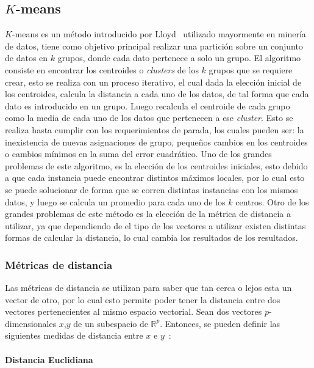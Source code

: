 	\subsection{$K$-means}
	\label{sec:k-means}
	$K$-means es un método introducido por Lloyd~\cite{Lloyd1982} utilizado mayormente en minería de datos, tiene como objetivo principal realizar una partición sobre un conjunto de datos en $k$ grupos, donde cada dato pertenece a solo un grupo.
	El algoritmo consiste en encontrar los centroides o \textit{clusters} de los $k$ grupos que se requiere crear, esto se realiza con un proceso iterativo, el cual dada la elección inicial de los centroides, calcula la distancia a cada uno de los datos, de tal forma que cada dato es introducido en un grupo. Luego recalcula el centroide de cada grupo como la media de cada uno de los datos que pertenecen a ese \textit{cluster}. Esto se realiza hasta cumplir con los requerimientos de parada, los cuales pueden ser: la inexistencia de nuevas asignaciones de grupo, pequeños cambios en los centroides o cambios mínimos en la suma del error cuadrático.
	Uno de los grandes problemas de este algoritmo, es la elección de los centroides iniciales, esto debido a que cada instancia puede encontrar distintos máximos locales, por lo cual esto se puede solucionar de forma que se corren distintas instancias con los mismos datos, y luego se calcula un promedio para cada uno de los $k$ centros.
	Otro de los grandes problemas de este método es la elección de la métrica de distancia a utilizar, ya que dependiendo de el tipo de los vectores a utilizar existen distintas formas de calcular la distancia, lo cual cambia los resultados de los resultados.
			
	\subsubsection{Métricas de distancia}
	\label{sec:matricas_de_distancia}
	Las métricas de distancia se utilizan para saber que tan cerca o lejos esta un vector de otro, por lo cual esto permite poder tener la distancia entre dos vectores pertenecientes al mismo espacio vectorial. 
	Sean dos vectores $p$-dimensionales $x$,$y$ de un subespacio de $\mathds{R}^p$. Entonces, se pueden definir las siguientes medidas de distancia entre $x$ e $y$~\cite{Pereira2010}:
	
\paragraph{Distancia Euclidiana}\label{deuclidiana}

